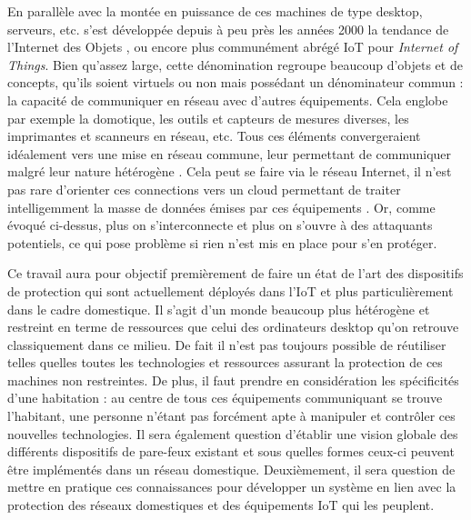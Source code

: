 \documentclass[]{article}
\begin{document}
\par En parallèle avec la montée en puissance de ces machines de type desktop, serveurs, etc. s'est développée depuis à peu près les années 2000 la tendance de l'\og Internet des Objets \fg{}, ou encore plus communément abrégé IoT pour \textit{Internet of Things}. Bien qu'assez large, cette dénomination regroupe beaucoup d'objets et de concepts, qu'ils soient virtuels ou non mais possédant un dénominateur commun : la capacité de communiquer en réseau avec d'autres équipements. Cela englobe par exemple la domotique, les outils et capteurs de mesures diverses, les imprimantes et scanneurs en réseau, etc. Tous ces éléments convergeraient idéalement vers une mise en réseau commune, leur permettant de communiquer malgré leur nature hétérogène \cite{Kubler2014}. Cela peut se faire via le réseau Internet, il n'est pas rare d'orienter ces connections vers un cloud permettant de traiter intelligemment la masse de données émises par ces équipements \cite{Huichen2016}. Or, comme évoqué ci-dessus, plus on s'interconnecte et plus on s'ouvre à des attaquants potentiels, ce qui pose problème si rien n'est mis en place pour s'en protéger.\\

\par Ce travail aura pour objectif premièrement de faire un état de l'art des dispositifs de protection qui sont actuellement déployés dans l'IoT et plus particulièrement dans le cadre domestique. Il s'agit d'un monde beaucoup plus hétérogène et restreint en terme de ressources que celui des ordinateurs desktop qu'on retrouve classiquement dans ce milieu.  De fait il n'est pas toujours possible de réutiliser telles quelles toutes les technologies et ressources assurant la protection de ces machines non restreintes. De plus, il faut prendre en considération les spécificités d'une habitation : au centre de tous ces équipements communiquant se trouve l'habitant, une personne n'étant pas forcément apte à manipuler et contrôler ces nouvelles technologies. Il sera également question d'établir une vision globale des différents dispositifs de pare-feux existant et sous quelles formes ceux-ci peuvent être implémentés dans un réseau domestique. Deuxièmement, il sera question de mettre en pratique ces connaissances pour développer un système en lien avec la protection des réseaux domestiques et des équipements IoT qui les peuplent.
\newpage


\end{document}
